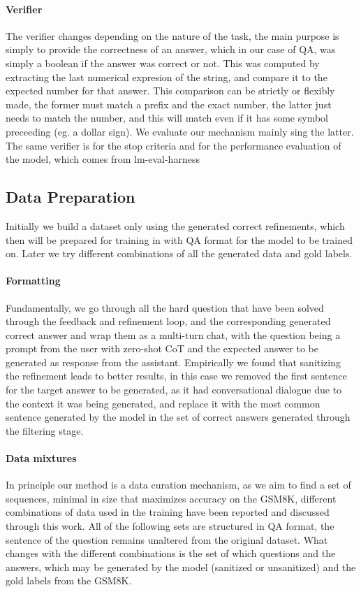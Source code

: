 \documentclass[a4paper,10pt]{article}
\begin{document}
\paragraph{Verifier}
The verifier changes depending on the nature of the task, the main purpose is simply to provide the correctness of an answer, which in our case of QA, was simply a boolean if the answer was correct or not. This was computed by extracting the last numerical expresion of the string, and compare it to the expected number for that answer. This comparison can be strictly or flexibly made, the former must match a prefix and the exact number, the latter just needs to match the number, and this will match even if it has some symbol preceeding (eg. a dollar sign). We evaluate our mechanism mainly sing the latter. The same verifier is for the stop criteria and for the performance evaluation of the model, which comes from lm-eval-harness


\subsection{Data Preparation}
Initially we build a dataset only using the generated correct refinements, which then will be prepared for training in with QA format for the model to be trained on. Later we try different combinations of all the generated data and gold labels.
\paragraph{Formatting}
Fundamentally, we go through all the hard question that have been solved through the feedback and refinement loop, and the corresponding generated correct answer and wrap them as a multi-turn chat, with the question being a prompt from the user with zero-shot CoT and the expected answer to be generated as response from the assistant. Empirically we found that sanitizing the refinement leads to better results, in this case we removed the first sentence for the target answer to be generated, as it had conversational dialogue due to the context it was being generated, and replace it with the most common sentence generated by the model in the set of correct answers generated through the filtering stage. 
\paragraph{Data mixtures}
In principle our method is a data curation mechanism, as we aim to find a set of sequences, minimal in size that maximizes accuracy on the GSM8K, different combinations of data used in the training have been reported and discussed through this work. All of the following sets are structured in QA format, the sentence of the question remains unaltered from the original dataset. What changes with the different combinations is the set of which questions and the answers, which may be generated by the model (sanitized or unsanitized) and the gold labels from the GSM8K. 
\end{document}
